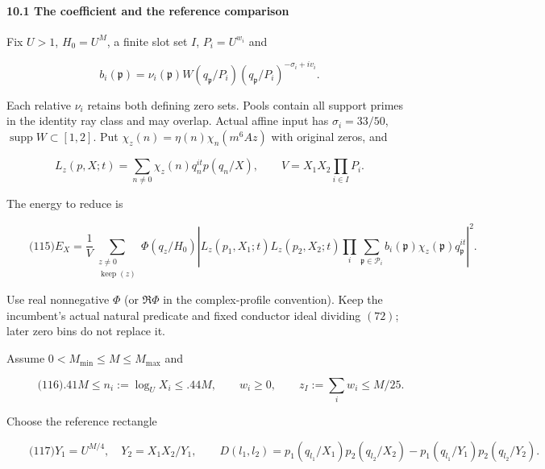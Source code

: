 \hypertarget{sr:coefficient}{}

\label{sr:coefficient}

\hypertarget{the-coefficient-and-the-reference-comparison}{%
\paragraph{10.1 The coefficient and the reference comparison}\label{the-coefficient-and-the-reference-comparison}}

Fix \(U>1\), \(H_0=U^M\), a finite slot set \(I\), \(P_i=U^{w_i}\) and

\[
b_i(\mathfrak p)=\nu_i(\mathfrak p)W(q_{\mathfrak p}/P_i)
       (q_{\mathfrak p}/P_i)^{-\sigma_i+iv_i}.
\]

Each relative \(\nu_i\) retains both defining zero sets. Pools contain all support primes in the identity ray class and may overlap. Actual affine input has \(\sigma_i=33/50\), \(\operatorname{supp}W\subset[1,2]\). Put \(\chi_z(n)=\eta(n)\chi_n(m^6Az)\) with original zeros, and

\[
L_z(p,X;t)=\sum_{n\ne0}\chi_z(n)q_n^{it}p(q_n/X),\qquad
 V=X_1X_2\prod_{i\in I}P_i.
\]

The energy to reduce is

\hypertarget{sr:energy}{}

\label{sr:energy}

\[
\qquad\text{(115)}
 E_X=\frac1V\sum_{\substack{z\ne0\\\operatorname{keep}(z)}}
 \Phi(q_z/H_0)
 \left|L_z(p_1,X_1;t)L_z(p_2,X_2;t)
       \prod_i\sum_{\mathfrak p\in\mathcal P_i}
         b_i(\mathfrak p)\chi_z(\mathfrak p)q_{\mathfrak p}^{it}\right|^2 .
\]

Use real nonnegative \(\Phi\) (or \(\Re\Phi\) in the complex-profile convention). Keep the incumbent's actual natural predicate and fixed conductor ideal dividing \((72)\); later zero bins do not replace it.

Assume \(0<M_{\min}\le M\le M_{\max}\) and

\hypertarget{sr:initial-scales}{}

\label{sr:initial-scales}

\[
\qquad\text{(116)}
 .41M\le n_i:=\log_UX_i\le .44M,\qquad
 w_i\ge0,\qquad z_I:=\sum_iw_i\le M/25.
\]

Choose the reference rectangle

\hypertarget{sr:comparison}{}

\label{sr:comparison}

\[
\qquad\text{(117)}
 Y_1=U^{M/4},\quad Y_2=X_1X_2/Y_1,\qquad
 D(l_1,l_2)=p_1(q_{l_1}/X_1)p_2(q_{l_2}/X_2)
          -p_1(q_{l_1}/Y_1)p_2(q_{l_2}/Y_2).
\]

